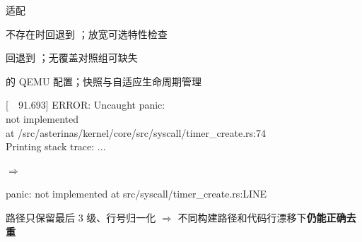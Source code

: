 \begin{frame}{\syz{} 适配}
\begin{tcbraster}[raster columns=3,raster equal height,raster column skip=2mm]
\begin{tcolorbox}[syzcard,title={执行器}]
   不存在时回退到 ；放宽可选特性检查
\end{tcolorbox}
\begin{tcolorbox}[syzcard,title={符号解析}]
  回退到 ；无覆盖对照组可缺失 
\end{tcolorbox}
\begin{tcolorbox}[syzcard,title={虚拟机管理}]
  \aster{} 的 QEMU 配置；快照与自适应生命周期管理
\end{tcolorbox}
\end{tcbraster}

\vspace{1mm}
\begin{tcolorbox}[syzcard,title={Rust panic 报告解析}]
\begin{minipage}[c]{0.65\linewidth}
  \begin{tcolorbox}[terminal]
\textcolor{SATcb!60}{[\ \ 91.693]} ERROR: Uncaught panic:\\
\hspace*{1.5em}not implemented\\
\hspace*{1.5em}at /src/asterinas/kernel/core/src/syscall/timer\_create.rs:74\\
Printing stack trace: ...
  \end{tcolorbox}
\end{minipage}\hfill
{\large\textcolor{SASyz}{$\Rightarrow$}}\hfill
\begin{minipage}[c]{0.3\linewidth}
  \begin{tcolorbox}[terminal,colback=SASyz,colframe=SASyz,left=3pt,right=3pt]
panic: not implemented at src/syscall/\allowbreak timer\_create.rs:LINE
  \end{tcolorbox}
\end{minipage}

\vspace{1mm}
路径只保留最后 3 级、行号归一化 $\Rightarrow$ 不同构建路径和代码行漂移下\textbf{仍能正确去重}
\end{tcolorbox}

\end{frame}

